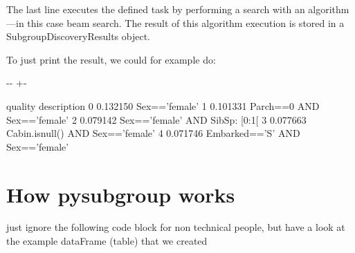 \documentclass[letterpaper,10pt,english]{sphinxmanual}
\newlength\nbsphinxcodecellspacing
\begin{document}
The last line executes the defined task by performing a search with an algorithm—in this case beam search. The result of this algorithm execution is stored in a SubgroupDiscoveryResults object.

To just print the result, we could for example do:

{
\begin{sphinxVerbatim}[commandchars=\\\{\}]
\llap{\color{nbsphinxin}[5]:\,\hspace{\fboxrule}\hspace{\fboxsep}}
\end{sphinxVerbatim}
}

{

\kern-\sphinxverbatimsmallskipamount\kern-\baselineskip
\kern+\FrameHeightAdjust\kern-\fboxrule
\vspace{\nbsphinxcodecellspacing}

\begin{sphinxVerbatim}[commandchars=\\\{\}]
\llap{\color{nbsphinxout}[5]:\,\hspace{\fboxrule}\hspace{\fboxsep}}    quality                       description
0  0.132150                     Sex=='female'
1  0.101331        Parch==0 AND Sex=='female'
2  0.079142    Sex=='female' AND SibSp: [0:1[
3  0.077663  Cabin.isnull() AND Sex=='female'
4  0.071746   Embarked=='S' AND Sex=='female'
\end{sphinxVerbatim}
}


\chapter{How pysubgroup works}
\label{\detokenize{tutorials/introduction2:How-pysubgroup-works}}\label{\detokenize{tutorials/introduction2::doc}}
just ignore the following code block for non technical people, but have a look at the example dataFrame (table) that we created
\end{document}
